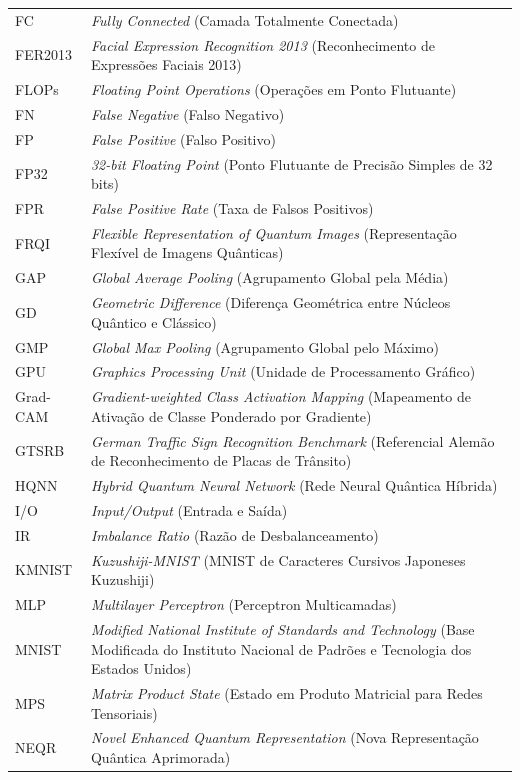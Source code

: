 \documentclass[
    12pt,
    openright,
    oneside,
    a4paper,
    english,
    brazil
]{abntex2}
\begin{document}
\begin{longtable}{@{}p{3.9cm}p{\dimexpr\textwidth-3.9cm-2\tabcolsep\relax}@{}}
FC & \textit{Fully Connected} (Camada Totalmente Conectada) \\
FER2013 & \textit{Facial Expression Recognition 2013} (Reconhecimento de Expressões Faciais 2013) \\
FLOPs & \textit{Floating Point Operations} (Operações em Ponto Flutuante) \\
FN & \textit{False Negative} (Falso Negativo) \\
FP & \textit{False Positive} (Falso Positivo) \\
FP32 & \textit{32-bit Floating Point} (Ponto Flutuante de Precisão Simples de 32 bits) \\
FPR & \textit{False Positive Rate} (Taxa de Falsos Positivos) \\
FRQI & \textit{Flexible Representation of Quantum Images} (Representação Flexível de Imagens Quânticas) \\
GAP & \textit{Global Average Pooling} (Agrupamento Global pela Média) \\
GD & \textit{Geometric Difference} (Diferença Geométrica entre Núcleos Quântico e Clássico) \\
GMP & \textit{Global Max Pooling} (Agrupamento Global pelo Máximo) \\
GPU & \textit{Graphics Processing Unit} (Unidade de Processamento Gráfico) \\
Grad-CAM & \textit{Gradient-weighted Class Activation Mapping} (Mapeamento de Ativação de Classe Ponderado por Gradiente) \\
GTSRB & \textit{German Traffic Sign Recognition Benchmark} (Referencial Alemão de Reconhecimento de Placas de Trânsito) \\
HQNN & \textit{Hybrid Quantum Neural Network} (Rede Neural Quântica Híbrida) \\
I/O & \textit{Input/Output} (Entrada e Saída) \\
IR & \textit{Imbalance Ratio} (Razão de Desbalanceamento) \\
KMNIST & \textit{Kuzushiji-MNIST} (MNIST de Caracteres Cursivos Japoneses Kuzushiji) \\
MLP & \textit{Multilayer Perceptron} (Perceptron Multicamadas) \\
MNIST & \textit{Modified National Institute of Standards and Technology} (Base Modificada do Instituto Nacional de Padrões e Tecnologia dos Estados Unidos) \\
MPS & \textit{Matrix Product State} (Estado em Produto Matricial para Redes Tensoriais) \\
NEQR & \textit{Novel Enhanced Quantum Representation} (Nova Representação Quântica Aprimorada) \\

\end{longtable}
\end{document}
